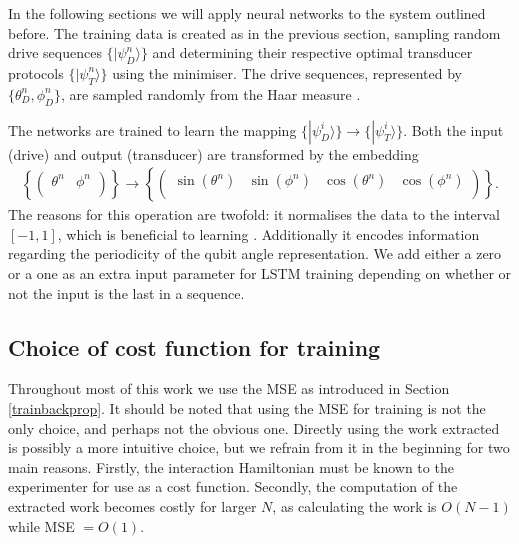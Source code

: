 In the following sections we will apply neural networks to the system outlined before.
The training data is created as in the previous section, sampling random drive sequences $\{|\psi_D^n \rangle\}$ and determining their respective optimal transducer protocols $\{|\psi_T^n \rangle\}$ using the minimiser.
The drive sequences, represented by $\{\theta_D^n, \phi_D^n\}$, are sampled randomly from the Haar measure \cite{Mezzadri}.

The networks are trained to learn the mapping $\{|\psi_D^i \rangle\} \to \{|\psi_T^i \rangle\}$.
Both the input (drive) and output (transducer) are transformed by the embedding
\begin{align} \label{embedding}
	\left\{
	\begin{pmatrix}
	\theta^n & \phi^n \\
	\end{pmatrix}
	\right\}
	\to
	\left\{
	\begin{pmatrix}
	\sin(\theta^n) & \sin(\phi^n) & \cos(\theta^n)  & \cos(\phi^n) \\
	\end{pmatrix}
	\right\}.
\end{align}
The reasons for this operation are twofold: it normalises the data to the interval $[-1, 1]$, which is beneficial to learning \cite{LeCun2012}. Additionally it encodes information regarding the periodicity of the qubit angle representation.
We add either a zero or a one as an extra input parameter for LSTM training depending on whether or not the input is the last in a sequence.

\subsection{Choice of cost function for training}
Throughout most of this work we use the MSE as introduced in Section \ref{trainbackprop}.
It should be noted that using the MSE for training is not the only choice, and perhaps not the obvious one.
Directly using the work extracted is possibly a more intuitive choice, but we refrain from it in the beginning for two main reasons.
Firstly, the interaction Hamiltonian must be known to the experimenter for use as a cost function.
Secondly, the computation of the extracted work becomes costly for larger $N$, as calculating the work is $O(N-1)$ while MSE $= O(1)$.

